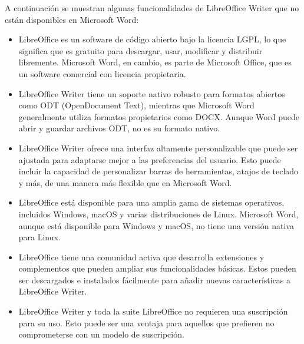 \documentclass[letterpaper,10pt,spanish]{sphinxmanual}
\begin{document}
\sphinxAtStartPar
A continuación se muestran algunas funcionalidades de LibreOffice Writer que no están disponibles en Microsoft Word:
\begin{itemize}
\item {} 
\sphinxAtStartPar
{} LibreOffice es un software de código abierto bajo la licencia LGPL, lo que significa que es gratuito para descargar, usar, modificar y distribuir libremente. Microsoft Word, en cambio, es parte de Microsoft Office, que es un software comercial con licencia propietaria.

\item {} 
\sphinxAtStartPar
{} LibreOffice Writer tiene un soporte nativo robusto para formatos abiertos como ODT (OpenDocument Text), mientras que Microsoft Word generalmente utiliza formatos propietarios como DOCX. Aunque Word puede abrir y guardar archivos ODT, no es su formato nativo.

\item {} 
\sphinxAtStartPar
{} LibreOffice Writer ofrece una interfaz altamente personalizable que puede ser ajustada para adaptarse mejor a las preferencias del usuario. Esto puede incluir la capacidad de personalizar barras de herramientas, atajos de teclado y más, de una manera más flexible que en Microsoft Word.

\item {} 
\sphinxAtStartPar
{} LibreOffice está disponible para una amplia gama de sistemas operativos, incluidos Windows, macOS y varias distribuciones de Linux. Microsoft Word, aunque está disponible para Windows y macOS, no tiene una versión nativa para Linux.

\item {} 
\sphinxAtStartPar
{} LibreOffice tiene una comunidad activa que desarrolla extensiones y complementos que pueden ampliar sus funcionalidades básicas. Estos pueden ser descargados e instalados fácilmente para añadir nuevas características a LibreOffice Writer.

\item {} 
\sphinxAtStartPar
{} LibreOffice Writer y toda la suite LibreOffice no requieren una suscripción para su uso. Esto puede ser una ventaja para aquellos que prefieren no comprometerse con un modelo de suscripción.

\end{itemize}
\end{document}
